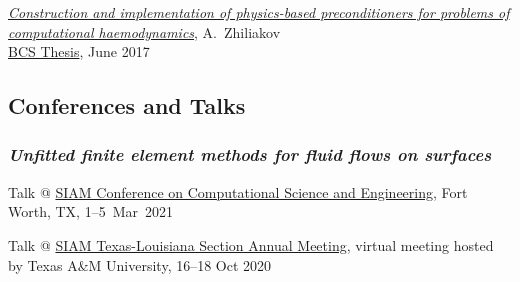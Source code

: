 \documentclass[a4paper,12pt]{article}
\begin{document}
\begin{etaremune}[topsep=0pt]
		\item \textit{\href{https://www.researchgate.net/publication/318039077_Postroenie_i_realizacia_fiziceskih_pereobuslavlivatelej_dla_zadac_vycislitelnoj_gemodinamiki}{Construction and implementation of physics-based preconditioners for problems of computational haemodynamics}}, A.~Zhiliakov\\ \href{https://elibrary.nstu.ru/source?id=61216}{BCS Thesis}, June 2017   
%			
%			
	\end{etaremune}

	\subsection*{Conferences and Talks}
	
	\subsubsection*{\textit{Unfitted finite element methods for fluid flows on surfaces}}
	\begin{etaremune}[topsep=0pt]
		\item Talk @ \href{https://www.siam.org/conferences/cm/conference/cse21}{SIAM Conference on Computational Science and Engineering}, Fort Worth, TX, 1--5~Mar~2021
		\item Talk @ \href{https://www.math.tamu.edu/conferences/SIAMTXLA/}{SIAM Texas-Louisiana Section Annual Meeting}, virtual meeting
		hosted by Texas A\&M University, 16--18 Oct 2020
	\end{etaremune}
\end{document}
